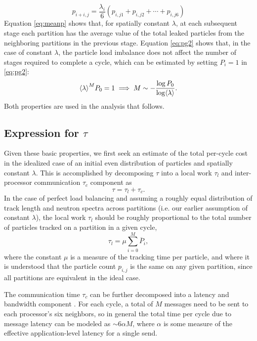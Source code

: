 \begin{equation}
  \label{eq:meanp}
  p_{i+i,j} = \frac{\lambda_i}{6} \left( p_{i,j1} + p_{i,j2} + \cdots + p_{i,j6}
  \right)
\end{equation}
Equation \eqref{eq:meanp} shows that, for spatially constant $\lambda$, at each
subsequent stage each partition has the average value of the total leaked
particles from the neighboring partitions in the previous stage.  Equation
\eqref{eq:pg2} shows that, in the case of constant $\lambda$, the particle load
imbalance does not affect the number of stages required to complete a cycle,
which can be estimated by setting $P_i = 1$ in \eqref{eq:pg2}:
\begin{equation}
  \label{eq:kfinal}
        {\langle \lambda \rangle}^M P_0 = 1 \implies M \sim -\frac{\log P_0}{\log \langle \lambda \rangle}.
\end{equation}
Both properties are used in the analysis that follows.

\subsection{Expression for $\tau$}

Given these basic properties, we first seek an estimate of the total per-cycle
cost in the idealized case of an initial even distribution of particles and
spatially constant $\lambda$.  This is accomplished by decomposing $\tau$ into a
local work $\tau_l$ and inter-processor communication $\tau_c$ component as
\begin{equation}
  \tau = \tau_l + \tau_c.
\end{equation}
In the case of perfect load balancing and assuming a roughly equal distribution
of track length and neutron spectra across partitions (i.e. our earlier
assumption of constant $\lambda$), the local work $\tau_l$ should be roughly
proportional to the total number of particles tracked on a partition in a given
cycle,
\begin{equation}
  \label{eq:loc_work}
  \tau_{l} = \mu \sum_{i=0}^{M} \overline{P}_{i},
\end{equation}
where the constant $\mu$ is a measure of the tracking time per particle, and
where it is understood that the particle count $p_{i,j}$ is the same on any
given partition, since all partitions are equivalent in the ideal case.

The communication time $\tau_c$ can be further decomposed into a latency and
bandwidth component \cite{jcp-siegel-2012-1}.  For each cycle, a total of $M$
messages need to be sent to each processor's six neighbors, so in general the
total time per cycle due to message latency can be modeled as $\sim 6 \alpha M$,
where $\alpha$ is some measure of the effective application-level latency for a
single send.

